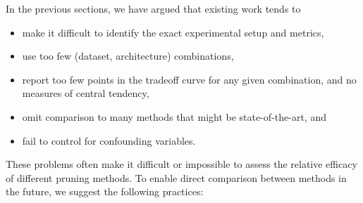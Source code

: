 In the previous sections, we have argued that existing work tends to
\begin{itemize}[leftmargin=4mm]
    \itemsep0pt
    \vspace{-3mm}
    \item make it difficult to identify the exact experimental setup and metrics,
    \item use too few (dataset, architecture) combinations,
    \item report too few points in the tradeoff curve for any given combination, and no measures of central tendency,
    \item omit comparison to many methods that might be state-of-the-art, and
    \item fail to control for confounding variables.
    \vspace{-3mm}
\end{itemize}
These problems often make it difficult or impossible to assess the relative efficacy of different pruning methods.
To enable direct comparison between methods in the future, we suggest the following practices:
